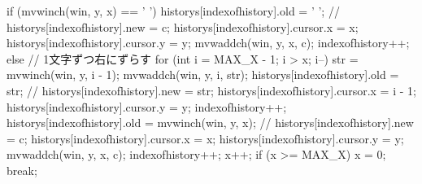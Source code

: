 \documentclass[a4paper,11pt]{jsarticle}
\begin{document}
{{{{                if (mvwinch(win, y, x) == ' ')
                {
                    historys[indexofhistory].old = ' ';
                    // historys[indexofhistory].new = c;
                    historys[indexofhistory].cursor.x = x;
                    historys[indexofhistory].cursor.y = y;
                    mvwaddch(win, y, x, c);
                    indexofhistory++;
                }
                else
                {
                    // 1文字ずつ右にずらす
                    for (int i = MAX_X - 1; i > x; i--)
                    {
                        str = mvwinch(win, y, i - 1);
                        mvwaddch(win, y, i, str);
                        historys[indexofhistory].old = str;
                        // historys[indexofhistory].new = str;
                        historys[indexofhistory].cursor.x = i - 1;
                        historys[indexofhistory].cursor.y = y;
                        indexofhistory++;
                    }
                    historys[indexofhistory].old = mvwinch(win, y, x);
                    // historys[indexofhistory].new = c;
                    historys[indexofhistory].cursor.x = x;
                    historys[indexofhistory].cursor.y = y;
                    mvwaddch(win, y, x, c);
                    indexofhistory++;
                }
                x++;
                if (x >= MAX_X)
                    x = 0;
                break;
            }
        }
    }
}
\end{document}
